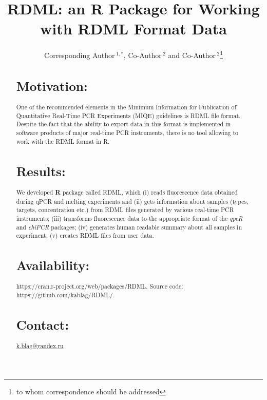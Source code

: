 \documentclass{bioinfo}
\begin{document}

\title[RDML]{RDML: an \textbf{R} Package for Working with RDML Format Data}
\author[Sample \textit{et~al}]{Corresponding Author\,$^{1,*}$, Co-Author\,$^{2}$ and Co-Author\,$^2$\footnote{to whom correspondence should be addressed}}
\address{$^{1}$Department of XXXXXXX, Address XXXX etc.\\
$^{2}$Department of XXXXXXXX, Address XXXX etc.}



\maketitle

\begin{abstract}

\section{Motivation:}
One of the recommended elements in the Minimum Information for Publication of 
Quantitative Real-Time PCR Experiments (MIQE) guidelines is RDML file format. 
Despite the fact that the ability to export data in this format is implemented 
in software products of major real-time PCR instruments, there is no tool allowing to work 
with the RDML format in R.

\section{Results:}
We developed \textbf{R} package called RDML, which (i) reads fluorescence data obtained 
during qPCR and melting experiments and (ii) gets information about samples 
(types, targets, concentration etc.) from RDML files generated by various real-time PCR 
instruments; (iii) transforms fluorescence data to the appropriate format of the 
\textit{qpcR} and \textit{chiPCR} packages; (iv) generates human readable 
summary about all samples in experiment; (v) creates RDML files from user data. 
\section{Availability:}
https://cran.r-project.org/web/packages/RDML. Source code:
https://github.com/kablag/RDML/.
\section{Contact:} \href{k.blag@yandex.ru}{k.blag@yandex.ru}
\end{abstract}
\end{document}
